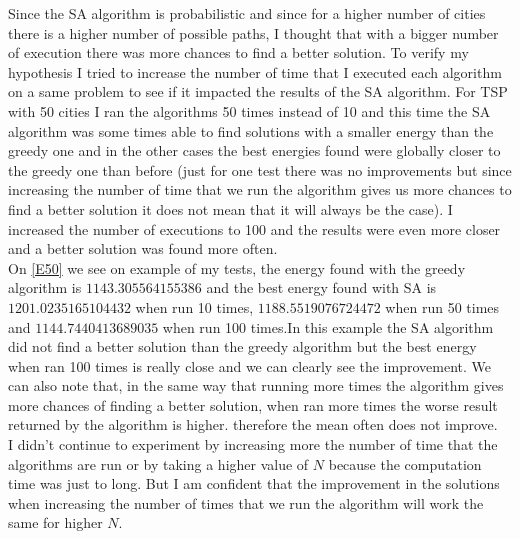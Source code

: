 \documentclass[14pt]
{article}
\begin{document}
Since the SA algorithm is probabilistic and since for a higher number of cities there is a higher number of possible paths, I thought that with a bigger number of execution there was more chances to find a better solution. To verify my hypothesis I tried to increase the number of time that I executed each algorithm on a same problem to see if it impacted the results of the SA algorithm. For TSP with 50 cities I ran the algorithms 50 times instead of 10 and this time the SA algorithm was some times able to find solutions with a smaller energy than the greedy one and in the other cases the best energies found were globally closer to the greedy one than before (just for one test there was no improvements but since increasing the number of time that we run the algorithm gives us more chances to find a better solution it does not mean that it will always be the case). I increased the number of executions to 100 and the results were even more closer and a better solution was found more often.\\
On \autoref{E50} we see on example of my tests, the energy found with the greedy algorithm is $1143.305564155386$ and the best energy found with SA is $1201.0235165104432$ when run 10 times, $1188.5519076724472$ when run 50 times and $1144.7440413689035$ when run 100 times.In this example the SA algorithm did not find a better solution than the greedy algorithm but the best energy when ran 100 times is really close and we can clearly see the improvement. We can also note that, in the same way that running more times the algorithm gives more chances of finding a better solution, when ran more times the worse result returned by the algorithm is higher. therefore the mean often does not improve.\\
I didn't continue to experiment by increasing more the number of time that the algorithms are run or by taking a higher value of $N$ because the computation time was just to long. But I am confident that the improvement in the solutions when increasing the number of times that we run the algorithm will work the same for higher $N$.
\end{document}
